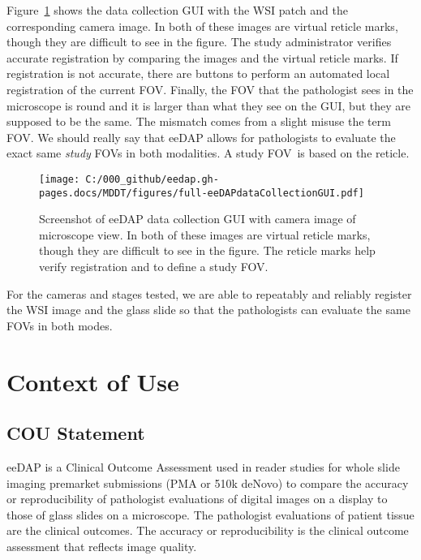 \documentclass{article}%
\begin{document}
Figure~\ref{fig_full-eeDAPdataCollectionGUI} shows the data collection GUI
with the WSI patch and the corresponding camera image. In both of these images
are virtual reticle marks, though they are difficult to see in the figure. The
study administrator verifies accurate registration by comparing the images and
the virtual reticle marks. If registration is not accurate, there are buttons
to perform an automated local registration of the current FOV. Finally, the
FOV that the pathologist sees in the microscope is round and it is larger than
what they see on the GUI, but they are supposed to be the same. The mismatch
comes from a slight misuse the term FOV. We should really say that eeDAP
allows for pathologists to evaluate the exact same \emph{study} FOVs in both
modalities. A study FOV\ is based on the reticle.

\begin{figure}[ptbh]
\label{fig_full-eeDAPdataCollectionGUI}
\texttt{[image: C:/000\_github/eedap.gh-pages.docs/MDDT/figures/full-eeDAPdataCollectionGUI.pdf]}\caption{Screenshot
of eeDAP data collection GUI with camera image of microscope view. In both of
these images are virtual reticle marks, though they are difficult to see in
the figure. The reticle marks help verify registration and to define a study
FOV.}%
\end{figure}

For the cameras and stages tested, we are able to repeatably and reliably
register the WSI image and the glass slide so that the pathologists can
evaluate the same FOVs in both modes.

\section{Context of Use}

\label{context-of-use}

\subsection{COU Statement}

eeDAP is a Clinical Outcome Assessment used in reader studies for whole slide
imaging premarket submissions (PMA or 510k deNovo) to compare the accuracy or
reproducibility of pathologist evaluations of digital images on a display to
those of glass slides on a microscope. The pathologist evaluations of patient
tissue are the clinical outcomes. The accuracy or reproducibility is the
clinical outcome assessment that reflects image quality.
\end{document}
